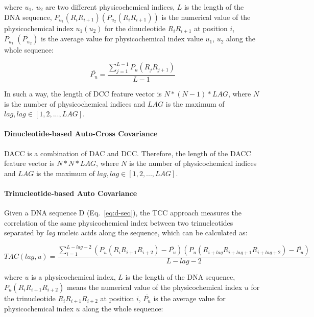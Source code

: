 where $u_{1}$, $u_{2}$ are two different physicochemical indices, $L$ is the length of the DNA sequence, $P_{u_{1}}(R_{i}R_{i+1}) (P_{u_{2}}(R_{i}R_{i+1}))$ is the numerical value of the physicochemical index $u_{1}(u_{2})$ for the dinucleotide $R_{i}R_{i+1}$ at position $i$, $\overline{P_{u_{1}}}\;(\overline{P_{u_{2}}})$ is the average value for physicochemical index value $u_{1}$, $u_{2}$ along the whole sequence:

\begin{equation}\label{eq:DAC-PU2}
    \overline{P_{u}} = \frac{\sum_{j=1}^{L-1}P_{u}(R_{j}R_{j+1})}{L-1}
\end{equation}

In such a way, the length of \gls{DCC} feature vector is $N*(N-1)*LAG$, where $N$ is the number of physicochemical indices and $LAG$ is the maximum of $lag, lag \in [1,2,...,LAG]$.

\paragraph{Dinucleotide-based Auto-Cross Covariance}
\gls{DACC} is a combination of \gls{DAC} and \gls{DCC}. Therefore, the length of the \gls{DACC} feature vector is $N*N*LAG$, where $N$ is the number of physicochemical indices and $LAG$ is the maximum of $lag, lag \in [1,2,...,LAG]$.


\paragraph{Trinucleotide-based Auto Covariance}
Given a DNA sequence D (Eq.~\ref{eq:d-seq}), the \gls{TCC} approach measures the correlation of the same physicochemical index between two trinucleotides separated by \textit{lag} nucleic acids along the sequence, which can be calculated as:

\begin{equation}\label{eq:tac}
    TAC(lag,u) = 
\frac
{
\sum_{i=1}^{L-lag-2}(P_{u}(R_{i}R_{i+1}R_{i+2}) - \overline{P_{u}})(P_{u}(R_{i+lag}R_{i+lag+1}R_{i+lag+2}) - \overline{P_{u}})
}
{
L-lag-2
}
\end{equation}

where $u$ is a physicochemical index, $L$ is the length of the DNA sequence, $P_{u}(R_{i}R_{i+1}R_{i+2})$ means the numerical value of the physicochemical index $u$ for the trinucleotide $R_{i}R_{i+1}R_{i+2}$ at position $i$, $\overline{P_{u}}$ is the average value for physicochemical index $u$ along the whole sequence:

